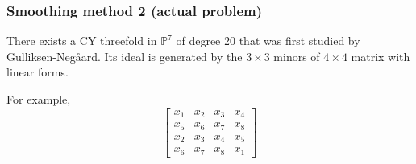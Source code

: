 \documentclass{beamer}
\begin{document}

\begin{frame}%
\frametitle{Smoothing method 2 (actual problem)}

There exists a CY threefold in $\mathbb{P}^7$ of degree
20 that was first studied 
by Gulliksen-Neg\aa ard.
Its ideal is generated by the
$3\times 3$ minors of $4\times 4$ matrix with linear forms.

\medskip\noindent
For example,
$$
\begin{bmatrix}
x_1 & x_2 & x_3 & x_4 \\
x_5 & x_6 & x_7 & x_8 \\
x_2 & x_3 & x_4 & x_5 \\
x_6 & x_7 & x_8 & x_1
\end{bmatrix}
$$
\end{frame}
\end{document}
